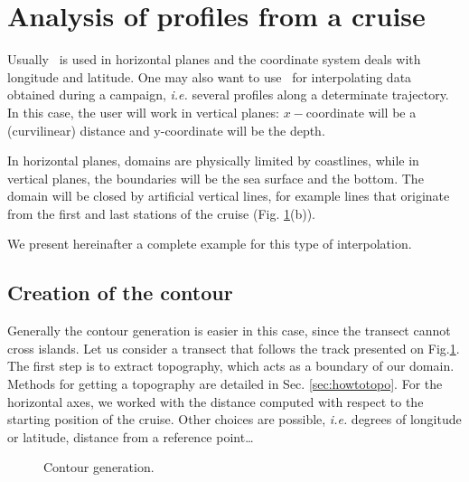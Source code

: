 




\section{Analysis of profiles from a cruise\label{sec:cruise}}

Usually \diva\, is used in horizontal planes and the coordinate system deals with longitude and latitude. One may also want to use \diva\, for interpolating data obtained during a campaign, \textit{i.e.} several profiles along a determinate trajectory. In this case, the user will work in vertical planes: $x-$coordinate will be a (curvilinear) distance and y-coordinate will be the depth.

In horizontal planes, domains are physically limited by coastlines, while in vertical planes, the boundaries will be the sea surface and the bottom. The domain will be closed by artificial vertical lines, for example lines that originate from the first and last stations of the cruise (Fig. \ref{fig:data}(b)).

We present hereinafter a complete example for this type of interpolation.


\subsection{Creation of the contour}

Generally the contour generation is easier in this case, since the transect cannot cross islands. Let us consider a transect that follows the track presented on Fig.\ref{fig:data}. The first step is to extract topography, which acts as a boundary of our domain. Methods for getting a topography are detailed in Sec. \ref{sec:howtotopo}. For the horizontal axes, we worked with the distance computed with respect to the starting position of the cruise. Other choices are possible, \textit{i.e.} degrees of longitude or latitude, distance from a reference point\ldots

\begin{figure}[htpb]
\centering
{}
\caption{Contour generation.\label{fig:data}}
\end{figure}


